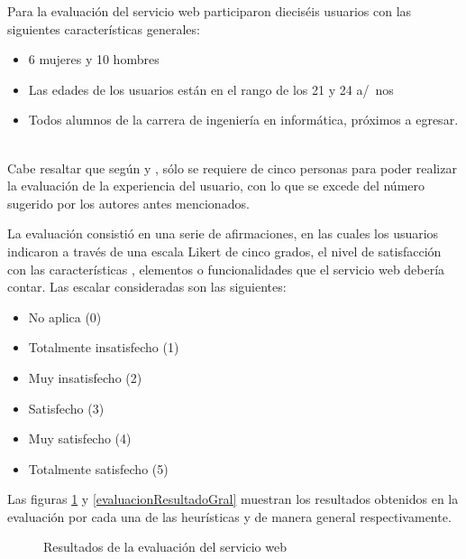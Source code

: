 Para la evaluaci\'on del servicio web participaron diecis\'eis usuarios con las siguientes caracter\'isticas generales:

\begin{itemize}
    \item 6 mujeres y 10 hombres
    \item Las edades de los usuarios est\'an en el rango de los 21 y 24 a/~{n}os
    \item Todos alumnos de la carrera de ingenier\'ia en inform\'atica, pr\'oximos a egresar.
    \ 
\end{itemize}{}

Cabe resaltar que seg\'un \cite{CincoEstrellas} y \cite{OnceHeuristicas}, s\'olo se requiere de cinco personas para poder realizar la evaluaci\'on de la experiencia del usuario, con lo que se excede del n\'umero sugerido por los autores antes mencionados.\newline

La evaluaci\'on consisti\'o en una serie de afirmaciones, en las cuales los usuarios indicaron a trav\'es de una escala Likert de cinco grados, el nivel de satisfacci\'on con las caracter\'isticas , elementos o funcionalidades que el servicio web deber\'ia contar. Las escalar consideradas son las siguientes:

\begin{itemize}
    \item No aplica (0)
    \item Totalmente insatisfecho (1)
    \item Muy insatisfecho (2)
    \item Satisfecho (3)
    \item Muy satisfecho (4)
    \item Totalmente satisfecho (5)
\end{itemize}{}

Las figuras \ref{evaluacionResultados} y \ref{evaluacionResultadoGral}  muestran los resultados obtenidos en la evaluaci\'on por cada una de las heur\'isticas y de manera general respectivamente.\newline

\begin{figure}[!ht]
	\centering
    \caption{Resultados de la evaluaci\'on del servicio web}
    \label{evaluacionResultados}
\end{figure}


